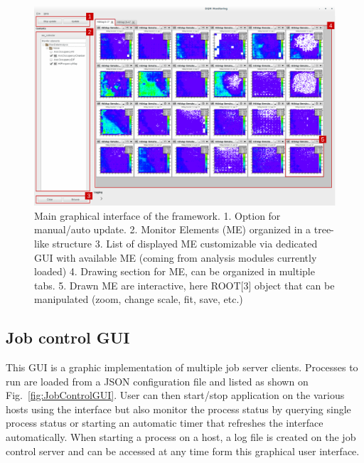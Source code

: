 \documentclass[conference]{IEEEtran}
\begin{document}
\begin{figure}[htbp]
  \begin{center}
    \includegraphics[width=.95\textwidth]{figs/MaintInterfaceGUI.pdf}
    \caption{\label{fig:DQMMainViz} Main graphical interface of the framework.
    1. Option for manual/auto update.
    2. Monitor Elements (ME) organized in a tree-like structure
    3. List of displayed ME customizable via dedicated GUI with available ME (coming from analysis modules currently loaded)
    4. Drawing section for ME, can be organized in multiple tabs.
    5. Drawn ME are interactive, here ROOT[3] object that can be manipulated (zoom, change scale, fit, save, etc.)
    }
  \end{center}
\end{figure}

\subsection{Job control GUI}

This GUI is a graphic implementation of multiple job server clients. Processes to run are loaded from a JSON configuration file and listed as shown on Fig.~\ref{fig:JobControlGUI}. User can then start/stop application on the various hosts using the interface but also monitor the process status by querying single process status or starting an automatic timer that refreshes the interface automatically. When starting a process on a host, a log file is created on the job control server and can be accessed at any time form this graphical user interface.
\end{document}
